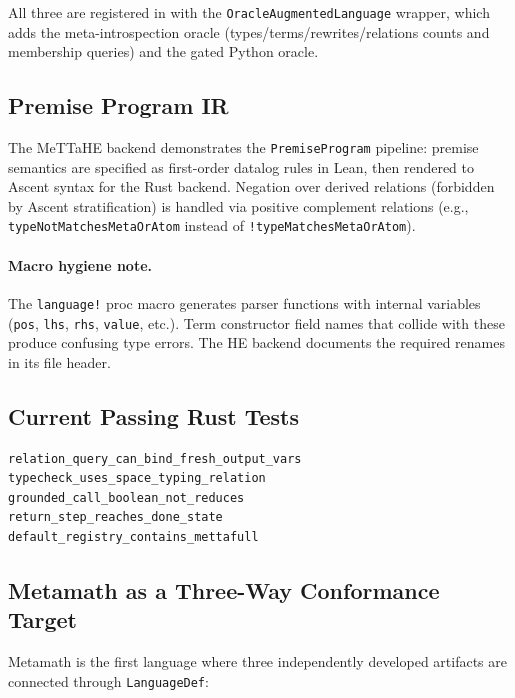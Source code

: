 \documentclass[11pt]{article}
\newcommand{\code}[1]{\texttt{#1}}
\newcommand{\codepath}[1]{\path{#1}}
\begin{document}
All three are registered in \codepath{repl/src/registry.rs} with the
\code{OracleAugmentedLanguage} wrapper, which adds the meta-introspection
oracle (types/terms/rewrites/relations counts and membership queries) and
the gated Python oracle.

\subsection{Premise Program IR}

The MeTTaHE backend demonstrates the \code{PremiseProgram} pipeline:
premise semantics are specified as first-order datalog rules in Lean,
then rendered to Ascent syntax for the Rust backend.  Negation over
derived relations (forbidden by Ascent stratification) is handled via
positive complement relations (e.g., \code{typeNotMatchesMetaOrAtom}
instead of \code{!typeMatchesMetaOrAtom}).

\paragraph{Macro hygiene note.}
The \code{language!} proc macro generates parser functions with internal
variables (\code{pos}, \code{lhs}, \code{rhs}, \code{value}, etc.).
Term constructor field names that collide with these produce confusing
type errors.  The HE backend documents the required renames in its file
header.

\subsection{Current Passing Rust Tests}

\begin{lstlisting}[language={},caption={MeTTa Rust canaries (all passing)}]
relation_query_can_bind_fresh_output_vars
typecheck_uses_space_typing_relation
grounded_call_boolean_not_reduces
return_step_reaches_done_state
default_registry_contains_mettafull
\end{lstlisting}

\subsection{Metamath as a Three-Way Conformance Target}

Metamath is the first language where three independently developed artifacts
are connected through \code{LanguageDef}:
\end{document}
